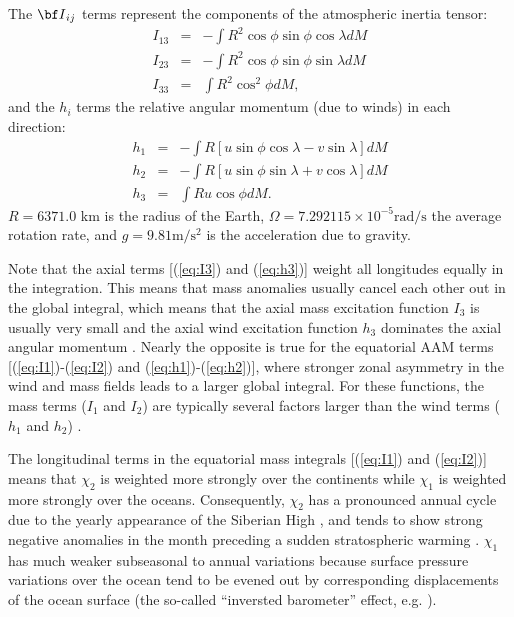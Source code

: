 The ${\bf I}_{ij}$ terms represent the components of the atmospheric inertia tensor:
\begin{eqnarray}
  I_{13} &=& -\int R^2 \cos \phi \sin \phi \cos \lambda dM 
  \label{eq:I1}\\
  I_{23} &=& -\int R^2 \cos \phi \sin \phi \sin \lambda dM 
  \label{eq:I2}\\
  I_{33} &=&  \int R^2 \cos^2 \phi dM ,
  \label{eq:I3}
\end{eqnarray}
and the $h_i$ terms the relative angular momentum (due to winds) in each direction:
\begin{eqnarray}
  h_{1}  &=& -\int R \left[u \sin \phi \cos \lambda - v \sin \lambda \right] dM 
    \label{eq:h1}\\
  h_{2}  &=& -\int R \left[u \sin \phi \sin \lambda + v \cos \lambda \right] dM 
    \label{eq:h2}\\
  h_{3}  &=&  \int R u \cos \phi dM.
    \label{eq:h3}
\end{eqnarray}
%
$R = 6371.0$ km is the radius of the Earth, $\Omega = 7.292115\times 10^{-5} \text{rad}/\text{s}$ the average rotation rate, and $g = 9.81 \text{m}/\text{s}^2$ is the acceleration due to gravity.

Note that the axial terms [(\ref{eq:I3}) and (\ref{eq:h3})] weight all longitudes equally in the integration.
This means that mass anomalies usually cancel each other out in the global integral, which means that the axial mass excitation function $I_3$ is usually very small and the axial wind excitation function $h_3$ dominates the axial angular momentum  \citep{barnesetal1983}.
%
Nearly the opposite is true for the equatorial AAM terms [(\ref{eq:I1})-(\ref{eq:I2}) and (\ref{eq:h1})-(\ref{eq:h2})], where stronger zonal asymmetry in the wind and mass fields leads to a larger global integral.
For these functions, the mass terms ($I_1$ and $I_2$) are typically several factors larger than the wind terms ($h_1$ and $h_2$)  \citep{barnesetal1983}.

The longitudinal terms in the equatorial mass integrals [(\ref{eq:I1}) and (\ref{eq:I2})] means that $\chi_2$ is weighted more strongly over the continents while $\chi_1$ is weighted more strongly over the oceans.
Consequently, $\chi_2$ has a pronounced annual cycle due to the yearly appearance of the Siberian High \citep{dobslawetal2010}, and tends to show strong negative anomalies in the month preceding a sudden stratospheric warming \citep{Neef2014}.
$\chi_1$ has much weaker subseasonal to annual variations because surface pressure variations over the ocean tend to be evened out by corresponding displacements of the ocean surface (the so-called ``inversted barometer'' effect, e.g. \citet{salsteinrosen1989}).

